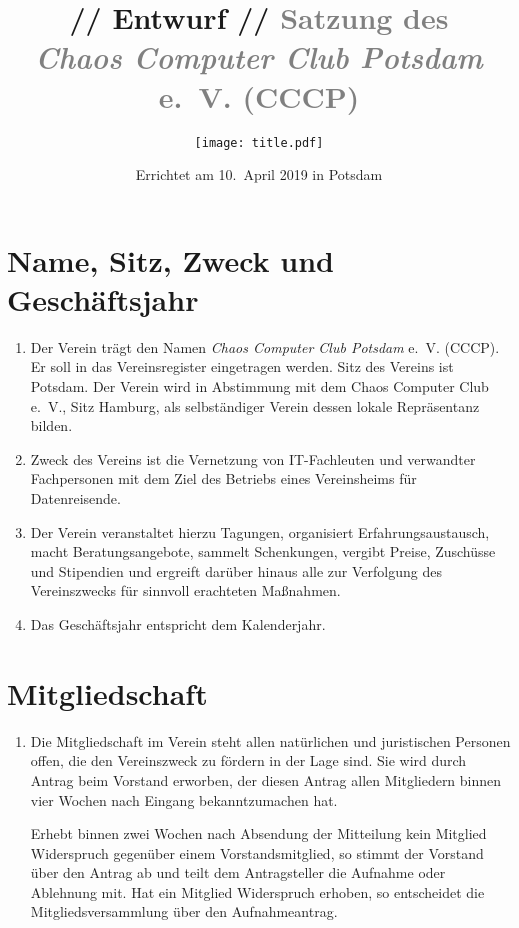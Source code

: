 \documentclass[a4paper, 10pt, headings=normal]{scrartcl}
\title{\textcolor{alert}{// Entwurf //} \textcolor{gray}{Satzung des \\ \emph{Chaos Computer Club Potsdam} e.~V. (CCCP)}}
\author{\texttt{[image: title.pdf]}}
\date{Errichtet am 10.~April 2019 in Potsdam}
\begin{document}
\maketitle
\pagestyle{myheadings}

\begin{multicols}{2}

\section{Name, Sitz, Zweck und Geschäftsjahr}
\label{par:name-sitz-zweck}

\begin{enumerate}[label={(\arabic*)}]
	\item
		Der Verein trägt den Namen \emph{Chaos Computer Club Potsdam} e.~V. (CCCP).
		Er soll in das Vereinsregister eingetragen werden.
		Sitz des Vereins ist Potsdam.
		Der Verein wird in Abstimmung mit dem Chaos Computer Club e.~V., Sitz Hamburg, als selbständiger Verein dessen lokale Repräsentanz bilden.
	\item
		Zweck des Vereins ist die Vernetzung von IT-Fachleuten und verwandter Fachpersonen mit dem Ziel des Betriebs eines Vereinsheims für Datenreisende.
	\item
		Der Verein veranstaltet hierzu Tagungen, organisiert Erfahrungsaustausch, macht Beratungsangebote, sammelt Schenkungen, vergibt Preise, Zuschüsse und Stipendien und ergreift darüber hinaus alle zur Verfolgung des Vereinszwecks für sinnvoll erachteten Maßnahmen.
	\item
		Das Geschäftsjahr entspricht dem Kalenderjahr.
\end{enumerate}

\section{Mitgliedschaft}
\label{par:mitgliedschaft}

\begin{enumerate}[label={(\arabic*)}]
	\item
		Die Mitgliedschaft im Verein steht allen natürlichen und juristischen Personen offen, die den Vereinszweck zu fördern in der Lage sind.
		Sie wird durch Antrag beim Vorstand erworben, der diesen Antrag allen Mitgliedern binnen vier Wochen nach Eingang bekanntzumachen hat.

		Erhebt binnen zwei Wochen nach Absendung der Mitteilung kein Mitglied Widerspruch gegenüber einem Vorstandsmitglied, so stimmt der Vorstand über den Antrag ab und teilt dem Antragsteller die Aufnahme oder Ablehnung mit.
		Hat ein Mitglied Widerspruch erhoben, so entscheidet die Mitgliedsversammlung über den Aufnahmeantrag.


\end{enumerate}
\end{multicols}
\end{document}
